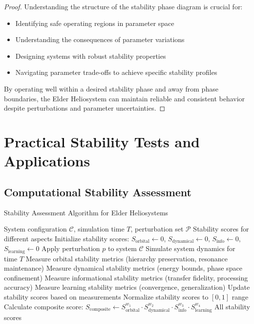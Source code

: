 \begin{proof}
Understanding the structure of the stability phase diagram is crucial for:
\begin{itemize}
    \item Identifying safe operating regions in parameter space
    \item Understanding the consequences of parameter variations
    \item Designing systems with robust stability properties
    \item Navigating parameter trade-offs to achieve specific stability profiles
\end{itemize}

By operating well within a desired stability phase and away from phase boundaries, the Elder Heliosystem can maintain reliable and consistent behavior despite perturbations and parameter uncertainties.
\end{proof}

\section{Practical Stability Tests and Applications}

\subsection{Computational Stability Assessment}

\begin{algorithm}[H]
\caption{Stability Assessment Algorithm for Elder Heliosystems}
\begin{algorithmic}[1]
\Require System configuration $\mathcal{C}$, simulation time $T$, perturbation set $\mathcal{P}$
\Ensure Stability scores for different aspects
\State Initialize stability scores: $S_{\text{orbital}} \gets 0$, $S_{\text{dynamical}} \gets 0$, $S_{\text{info}} \gets 0$, $S_{\text{learning}} \gets 0$
    \State Apply perturbation $p$ to system $\mathcal{C}$
    \State Simulate system dynamics for time $T$
    \State Measure orbital stability metrics (hierarchy preservation, resonance maintenance)
    \State Measure dynamical stability metrics (energy bounds, phase space confinement)
    \State Measure informational stability metrics (transfer fidelity, processing accuracy)
    \State Measure learning stability metrics (convergence, generalization)
    \State Update stability scores based on measurements
\EndFor
\State Normalize stability scores to $[0, 1]$ range
\State Calculate composite score: $S_{\text{composite}} \gets S_{\text{orbital}}^{w_1} \cdot S_{\text{dynamical}}^{w_2} \cdot S_{\text{info}}^{w_3} \cdot S_{\text{learning}}^{w_4}$
\State \Return All stability scores
\end{algorithmic}
\end{algorithm}

